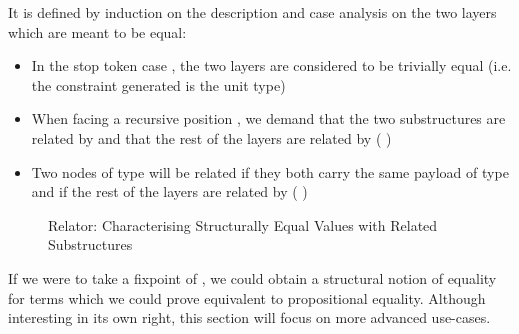 It is defined by induction on the description and case analysis on the two
layers which are meant to be equal:
\begin{itemize}
  \item In the stop token case  , the two layers are considered to
    be trivially equal (i.e. the constraint generated is the unit type)
  \item When facing a recursive position { \AB{$\Delta$}  }, we
    demand that the two substructures are related by { \AB{$\Delta$} }
    and that the rest of the layers are related by (   )
  \item Two nodes of type {  } will
    be related if they both carry the same payload  of type  and if
    the rest of the layers are related by (    )
\end{itemize}

\begin{figure}[h]
\caption{Relator: Characterising Structurally Equal Values with Related Substructures\label{fig:zip-rel}}
\end{figure}

If we were to take a fixpoint of , we could obtain a structural
notion of equality for terms which we could prove equivalent to propositional
equality. Although interesting in its own right, this section will focus
on more advanced use-cases.





